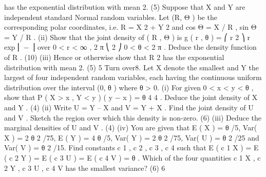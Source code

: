 has the exponential distribution with mean 2.
(5)
Suppose that X and Y are independent standard Normal random variables. Let (R, Θ )
be the corresponding polar coordinates, i.e.
R = X 2 + Y 2 and cos Θ = X / R , sin Θ = Y / R .
(ii)
Show that the joint density of ( R , Θ ) is g ( r , θ ) =
⎛ r 2 ⎞
r
exp ⎜ − ⎟ over 0 < r < ∞ ,
2 π
⎝ 2 ⎠
0 < θ < 2 π . Deduce the density function of R .
(10)
(iii) Hence or otherwise show that R 2 has the exponential distribution with mean 2.
(5)
5
Turn over8.
Let X denote the smallest and Y the largest of four independent random variables, each
having the continuous uniform distribution over the interval (0, θ ) where θ > 0.
(i)
For given 0 < x < y < θ , show that P ( X > x , Y < y )
( y − x )
=
θ 4
4
. Deduce the
joint density of X and Y .
(4)
(ii) Write U = Y – X and V = Y + X . Find the joint density of U and V . Sketch the
region over which this density is non-zero.
(6)
(iii) Deduce the marginal densities of U and V .
(4)
(iv)
You are given that E ( X ) = θ /5, Var( X ) = 2 θ 2 /75, E ( Y ) = 4 θ /5, Var( Y ) = 2 θ 2 /75,
Var( U ) = θ 2 /25 and Var( V ) = θ 2 /15. Find constants c 1 , c 2 , c 3 , c 4 such that
E ( c 1 X ) = E ( c 2 Y ) = E ( c 3 U ) = E ( c 4 V ) = θ . Which of the four quantities c 1 X , c 2 Y ,
c 3 U , c 4 V has the smallest variance?
(6)
6
